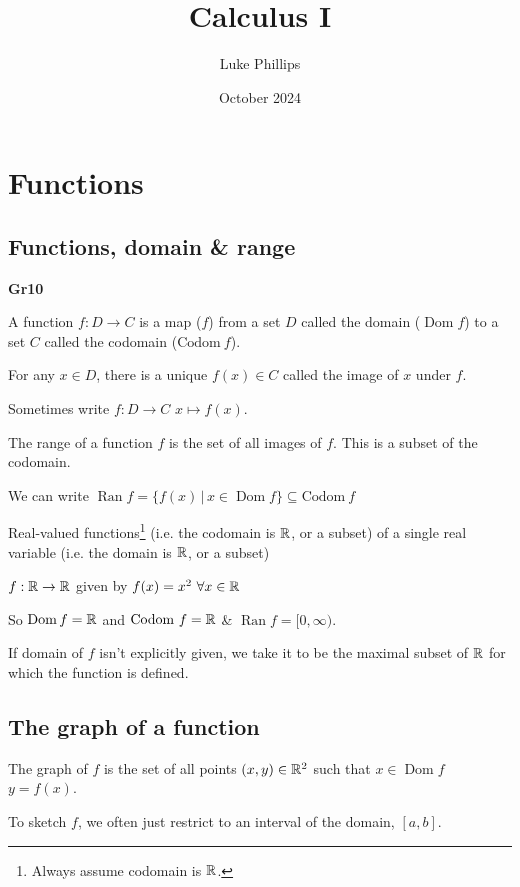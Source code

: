\documentclass[10pt, a4paper]{article}
\title{Calculus I}
\author{Luke Phillips}
\date{October 2024}
\DeclareMathOperator{\Dom}{Dom}
\DeclareMathOperator{\Ran}{Ran}
\begin{document}
\maketitle

\newpage

\section{Functions}

\subsection{Functions, domain \& range}

\textbf{Gr10}

\begin{definition}
    A function $f : D \rightarrow C$ is a map ($f$) from a set $D$ called the domain ($\Dom f$) to a set $C$ called the codomain ($\mathrm{Codom}\ f$).
    
    For any $x \in D$, there is a unique $f(x) \in C$ called the image of $x$ under $f$.
\end{definition}

Sometimes  write $f : D \rightarrow C$ $x \mapsto f(x)$.

\begin{definition}
    The range of a function $f$ is the set of all images of $f$. This is a subset of the codomain.
    
    We can write $\Ran f = \{f(x)\,|\,x \in \Dom f\} \subseteq \mathrm{Codom}\ f$
\end{definition}

Real-valued functions\footnote{Always assume codomain is $\mathbb{R}$.} (i.e. the codomain is $\mathbb{R}$, or a subset) of a single real variable (i.e. the domain is $\mathbb{R}$, or a subset)

\begin{example}
    $f : \mathbb{R} \rightarrow \mathbb{R}$ given by $f(x) = x ^ 2\ \forall x \in \mathbb{R}$

    So $\Dom f = \R$ and $\mathrm{Codom}\ f = \mathbb{R}$ \& $\Ran f = [0, \infty)$.
\end{example}

If domain of $f$ isn't explicitly given, we take it to be the maximal subset of $\mathbb{R}$ for which the function is defined.

\subsection{The graph of a function}
\begin{definition}[Graph]
    The graph of $f$ is the set of all points $(x, y) \in \mathbb{R} ^ 2$ such that $x \in \Dom f$ $y = f(x)$.
\end{definition}
To sketch $f$, we often just restrict to an interval of the domain, $[a, b]$.
\end{document}
